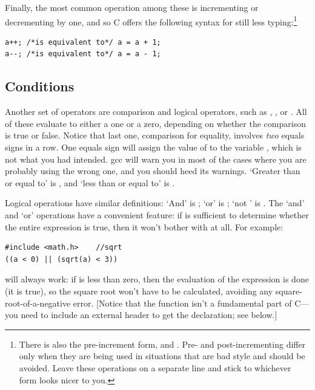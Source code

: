 \documentclass[12pt]{article}
\makeatletter
\def\ttindex#1{\index{#1@\cinline{#1}}}
\makeatother
\begin{document}
Finally, the most common operation among these is incrementing or decrementing by one, and so C offers the
following syntax for still less typing:\footnote{There is also the pre-increment form,  and
. Pre- and post-incrementing differ only when they are being used in situations that are bad style and should
be avoided. Leave these operations on a separate line and stick to whichever form looks nicer to you.} \\
\begin{lstlisting}
a++; /*is equivalent to*/ a = a + 1;
a--; /*is equivalent to*/ a = a - 1;
\end{lstlisting}



\subsection{Conditions} 	
\label{forloops}    
\ttindex{<} \ttindex{>} \ttindex{==}
Another set of operators are comparison and logical operators, such as ,
, or . All of these evaluate to either a one or a zero, depending on whether the
comparison is true or false. Notice that last one, comparison for equality, involves {\sl two} equals
signs in a row. One equals sign  will assign the value of  to the variable , which is not what
you had intended. gcc will warn you in most of the cases where you are
probably using the wrong one, and you should heed its warnings. `Greater than or equal to' is , and `less than or equal to' is .

Logical operations have similar definitions: \ttindex{\&\&} \ttindex{"|"|} 
  
`And' is ; `or' is ; `not ' is .
The `and' and `or' operations have a convenient feature: if  is sufficient to determine whether
the entire expression is true, then it won't bother with  at all. For example:
\begin{lstlisting}
#include <math.h>    //sqrt
((a < 0) || (sqrt(a) < 3))
\end{lstlisting}
will always work: if  is less than zero, then the evaluation of the expression is done (it is true),
so the square root won't have to be calculated, avoiding any
square-root-of-a-negative error. [Notice that the  function
isn't a fundamental part of C---you need to include an external header to get the declaration; see below.]
\end{document}
